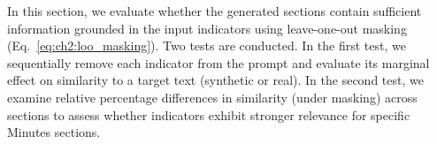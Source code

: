 In this section, we evaluate whether the generated sections contain sufficient information grounded in the input indicators using leave-one-out masking (Eq.~\ref{eq:ch2:loo_masking}). Two tests are conducted. In the first test, we sequentially remove each indicator from the prompt and evaluate its marginal effect on similarity to a target text (synthetic or real). In the second test, we examine relative percentage differences in similarity (under masking) across sections to assess whether indicators exhibit stronger relevance for specific Minutes sections.

